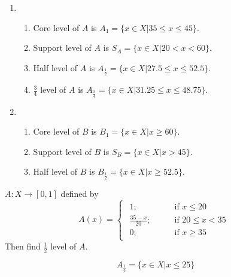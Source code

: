 \documentclass[../main-sheet.tex]{subfiles}
\begin{document}
\begin{soln}
    \begin{enumerate}
        \item \begin{enumerate}
            \item Core level of \(A \) is \(A_1=\{x\in X|35\leq x\leq45\}\).
            \item Support level of \(A \) is \(S_A=\{x\in X|20<x<60\}\).
            \item Half level of \(A \) is \(A_{\frac{1}{2}}=\{x\in X|27.5\leq x\leq52.5\}\).
            \item \(\frac{3}{4}\) level of \(A \) is \(A_{\frac{3}{4}}=\{x\in X|31.25\leq x\leq48.75\}\).
        \end{enumerate}
        \item \begin{enumerate}
            \item Core level of \(B \) is \(B_1=\{x\in X|x\geq 60\}\).
            \item Support level of \(B \) is \(S_B=\{x\in X|x>45\}\).
            \item Half level of \(B \) is \(B_{\frac{1}{2}}=\{x\in X|x\geq52.5\}\).
        \end{enumerate}
    \end{enumerate}
\end{soln}
\begin{ex}
    \(A:X\to [0,1]\) defined by 
    \[
        A(x)=\begin{cases}
            \begin{aligned}
                1; \qquad&\text{if } x\leq20\\
                \frac{35-x}{20}; \qquad&\text{if }20\leq x <35\\
                0; \qquad&\text{if }x\geq35
            \end{aligned}
    \end{cases}
    \]
    Then find \(\frac{1}{2}\) level of \(A \).
\end{ex}
\begin{soln}
    \[A_\frac{1}{2}=\{x\in X|x\leq 25\}\]
\end{soln}
\end{document}

